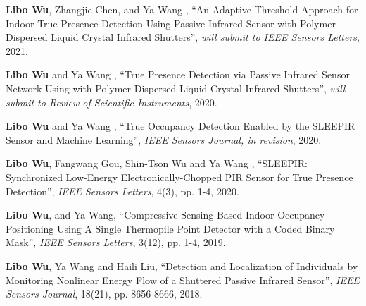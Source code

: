 

\begin{cvparagraph}

    \vspace{12pt}
    \begin{cvitems}
    \setlength{\itemsep}{2pt}
    \item{
        \textbf{Libo Wu}{, Zhangjie Chen, and Ya Wang , ``An Adaptive Threshold Approach for Indoor True Presence Detection Using Passive Infrared Sensor with Polymer Dispersed Liquid Crystal Infrared Shutters'', \textit{will submit to IEEE Sensors Letters}, 2021.}}
     
    \item{
        \textbf{Libo Wu}{ and Ya Wang , ``True Presence Detection via Passive Infrared Sensor Network Using with Polymer Dispersed Liquid Crystal Infrared Shutters'', \textit{will submit to Review of Scientific Instruments}, 2020.}}
      
    \item{
        \textbf{Libo Wu}{ and Ya Wang , ``True Occupancy Detection Enabled by the SLEEPIR Sensor and Machine Learning'', \textit{IEEE Sensors Journal, in revision}, 2020.}}
      
    \item{
        \textbf{Libo Wu}{, Fangwang Gou, Shin-Tson Wu and Ya Wang , ``SLEEPIR: Synchronized Low-Energy Electronically-Chopped PIR Sensor for True Presence Detection'', \textit{IEEE Sensors Letters}, 4(3), pp. 1-4, 2020.}}
        
    \item{
        \textbf{Libo Wu}{, and Ya Wang, ``Compressive Sensing Based Indoor Occupancy Positioning Using A Single Thermopile Point Detector with a Coded Binary Mask'', \textit{IEEE Sensors Letters}, 3(12), pp. 1-4, 2019.}}
  
    \item{
        \textbf{Libo Wu}{, Ya Wang and Haili Liu, ``Detection and Localization of Individuals by Monitoring Nonlinear Energy Flow of a Shuttered Passive Infrared Sensor'', \textit{IEEE Sensors Journal}, 18(21), pp. 8656-8666, 2018.}}
  

\end{cvitems}
\end{cvparagraph}
